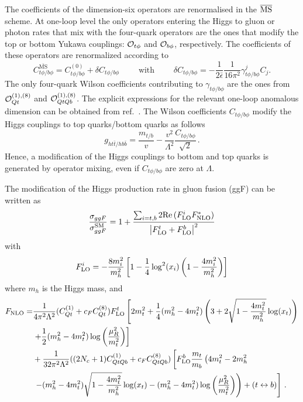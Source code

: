 The coefficients of the dimension-six operators 
are renormalised in the $\overline{\mathrm{MS}}$ \;scheme.
At one-loop level the only operators entering the Higgs to gluon or photon rates that mix with the four-quark operators are the ones that modify the top or bottom Yukawa couplings: ${\cal O}_{t\phi}$ and ${\cal O}_{b\phi}$, respectively. The coefficients of these operators are renormalized according to
\begin{equation}
	C^{\bar{\text{MS}}}_{t\phi/b\phi}=C^{(0)}_{t\phi/b\phi}+\delta C_{t\phi/b\phi}\quad\quad \text{   with   }\quad\quad \delta C_{t\phi/b\phi} = -\frac{1}{2\bar{\epsilon}}\frac{1}{16 \pi^2} \gamma^{j}_{t\phi/b\phi} C_j.
\end{equation}
The only four-quark Wilson coefficients contributing to $\gamma_{t\phi/b\phi}$ are the ones from ${\cal O}_{Qt}^{(1),(8)}$ and  ${\cal O}_{QtQb}^{(1),(8)}$. 
The explicit expressions for the relevant one-loop anomalous dimension can be obtained from ref.~\cite{Jenkins:2013zja,Jenkins:2013wua}. 
The Wilson coefficients $C_{t\phi/b\phi}$ modify the Higgs couplings to top quarks/bottom quarks as follows
\begin{equation}
	g_{ht\bar{t}/hb\bar{b}}=\frac{m_{t/b}}{v}-\frac{v^2}{\Lambda^2}\frac{C_{t\phi/b\phi}}{\sqrt{2}}\,.
\end{equation}
Hence, a modification of the Higgs couplings to bottom and top quarks is generated by operator mixing, even if $C_{t\phi/b\phi}$ are zero at $\Lambda$.
\par
The modification of the Higgs production rate in gluon fusion (ggF) can be written as
\begin{equation}
	\frac{\sigma_{ggF}}{\sigma_{ggF}^{\mathrm{SM}}}= 1+ \frac{ \sum_{i=t,b} 2 \mbox{Re}\,(F_{\textrm{LO}}^i F^*_{\textrm{NLO}})}{\left| F_{\textrm{LO}}^t+F_{\textrm{LO}}^b  \right|^2} \label{eq:production}
\end{equation}
with 
%
\begin{equation}
	F_{\textrm{LO}}^i=-\frac{8m_i^2}{m_h^2}\left[1-\frac{1}{4}\log^2(x_i)\left(1-\frac{4m_i^2}{m_h^2}\right)\right]
\end{equation}
where $m_h$ is the Higgs mass,
and
%
\begin{equation}
	\begin{split}
		F_{\textrm{NLO}}=&\frac{ 1}{4\pi^2  \Lambda^2}(C_{Qt}^{(1)}+c_FC_{Qt}^{(8)})F_{\textrm{LO}}^t \left[ 2 m_t^2  +\frac{1}{4} (m_h^2-4 m_t^2) \left( 3 +2 \sqrt{1-\frac{4 m_t^2}{m_h^2}} \log(x_t) \right)  \right. \\ & \left.
		+\frac{1}{2} (m_h^2-4 m_t^2) \log\left(\frac{\mu_R^2}{m_t^2}\right)\right] \\ & + 
		\frac{1}{32 \pi^2 \Lambda^2} ((2N_c+1)C_{QtQb}^{(1)}+c_FC_{QtQb}^{(8)}) \left[ F_{\textrm{LO}}^b \frac{m_t}{m_b}\left( 4 m_t^2-2 m_h^2 \right. \right.\\ & \left. \left. - (m_h^2-4 m_t^2)\sqrt{1-\frac{4 m_t^2}{m_h^2}} \log(x_t)-(m_h^2-4 m_t^2)\log\left(\frac{\mu_R^2}{m_t^2}\right)\right) +(t\leftrightarrow b)\right]  \,. \label{eq:FNLO}
	\end{split}
\end{equation}
